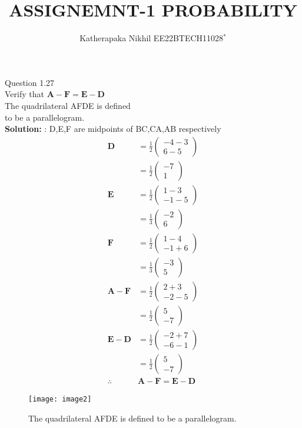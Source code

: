 \documentclass[journal,12pt,twocolumn]{IEEEtran}
\newcommand{\solution}{\noindent \textbf{Solution: }}
\theoremstyle{remark}
\let\vec\mathbf
\newcommand{\myvec}[1]{\ensuremath{\begin{pmatrix}#1\end{pmatrix}}}
\begin{document}
%




\vspace{3cm}

\title{
ASSIGNEMNT-1 PROBABILITY
}
\author{ Katherapaka Nikhil EE22BTECH11028$^{*}$%
}	


\maketitle

\newpage


\bigskip

\renewcommand{\thefigure}{\theenumi}
\renewcommand{\thetable}{\theenumi}



Question 1.27\\
Verify that
$\vec{A}-\vec{F}=\vec{E}-\vec{D}$ \\
The quadrilateral AFDE is defined\\ 
to be a parallelogram.\\
\solution:
D,E,F are midpoints of BC,CA,AB respectively
\begin{align}
\vec{D}&=\frac{1}{2}\myvec{-4-3 \\ 6-5}\\
&=\frac{1}{2}\myvec{-7 \\ 1}\\
\vec{E}&=\frac{1}{2}\myvec{1-3 \\ -1-5}\\
&=\frac{1}{3}\myvec{-2 \\ 6}\\
\vec{F}&=\frac{1}{2}\myvec{1-4 \\ -1+6}\\
&=\frac{1}{3}\myvec{-3 \\ 5}\\
\vec{A}-\vec{F}&=\frac{1}{2}\myvec{2+3 \\ -2-5}\\
&=\frac{1}{2}\myvec{5 \\ -7}\\
\vec{E}-\vec{D}&=\frac{1}{2}\myvec{-2+7 \\ -6-1}\\
&=\frac{1}{2}\myvec{5 \\ -7}\\
\therefore{}&\vec{A-F=E-D}
\end{align}
\begin{figure}[t]
\centering
\texttt{[image: image2]}
\caption{The quadrilateral AFDE is defined to be a parallelogram.}
\label{fig:image2}
\end{figure}
\end{document}
